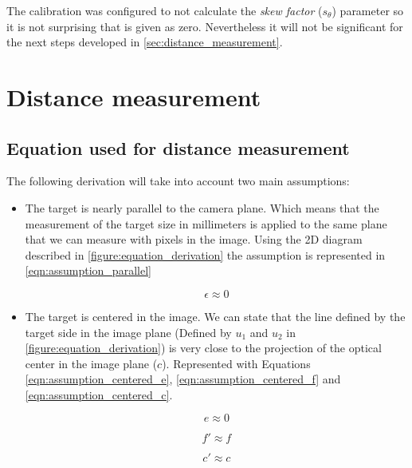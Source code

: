 \documentclass[
a4paper,
12pt,
]{article}
\begin{document}
The calibration was configured to not calculate the \emph{skew factor} ($s_{\theta}$) parameter so it is not surprising that is given as zero. Nevertheless it will not be significant for the next steps developed in \autoref{sec:distance_measurement}.

\clearpage

\section{Distance measurement}
\label{sec:distance_measurement}

\subsection{Equation used for distance measurement}
\label{subsec:distance_measurement_equation}

The following derivation will take into account two main assumptions:
\begin{itemize}
\item The target is nearly parallel to the camera plane. Which means that the measurement of the target size in millimeters is applied to the same plane that we can measure with pixels in the image. Using the 2D diagram described in \autoref{figure:equation_derivation} the assumption is represented in \autoref{eqn:assumption_parallel}

\begin{equation}
\label{eqn:assumption_parallel}
\epsilon \approx 0
\end{equation}

\item The target is centered in the image. We can state that the line defined by the target side in the image plane (Defined by $u_1$ and $u_2$ in \autoref{figure:equation_derivation}) is very close to the projection of the optical center in the image plane ($c$). Represented with Equations \ref{eqn:assumption_centered_e}, \ref{eqn:assumption_centered_f} and \ref{eqn:assumption_centered_c}.

\begin{minipage}{0.25\textwidth}
\begin{equation}
\label{eqn:assumption_centered_e}
e \approx 0
\end{equation}
\end{minipage}
\begin{minipage}{0.25\textwidth}
\begin{equation}
\label{eqn:assumption_centered_f}
f' \approx f
\end{equation}
\end{minipage}
\begin{minipage}{0.25\textwidth}
\begin{equation}
\label{eqn:assumption_centered_c}
c' \approx c
\end{equation}
\end{minipage}

\end{itemize}
\end{document}
